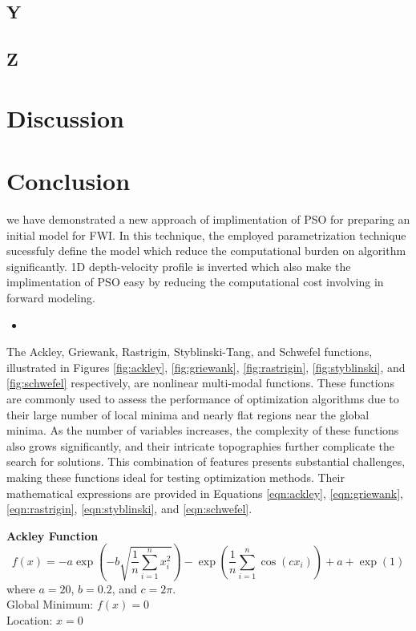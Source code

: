 \documentclass[paper,revised]{geophysics}
\begin{document}
\subsection{Y}
\subsection{Z}
\section{Discussion}
\section{Conclusion}
we have demonstrated a new approach of implimentation of PSO for preparing an initial model for FWI. In this technique, the employed parametrization technique sucessfuly define  the model which reduce the computational burden on algorithm significantly. 1D depth-velocity profile is inverted which also make the implimentation of PSO easy by reducing the computational cost involving in forward modeling.
\begin{itemize}
	\item 
\end{itemize}
\begin{acknowledgments}

\end{acknowledgments}

 \label{appendix_1}
The Ackley, Griewank, Rastrigin, Styblinski-Tang, and Schwefel functions, illustrated in Figures \ref{fig:ackley}, \ref{fig:griewank}, \ref{fig:rastrigin}, \ref{fig:styblinski}, and \ref{fig:schwefel} respectively, are nonlinear multi-modal functions. These functions are commonly used to assess the performance of optimization algorithms due to their large number of local minima and nearly flat regions near the global minima. As the number of variables increases, the complexity of these functions also grows significantly, and their intricate topographies further complicate the search for solutions. This combination of features presents substantial challenges, making these functions ideal for testing optimization methods.
Their mathematical expressions are provided in Equations \ref{eqn:ackley}, \ref{eqn:griewank}, \ref{eqn:rastrigin}, \ref{eqn:styblinski}, and \ref{eqn:schwefel}.

{\bf{Ackley Function}}
\begin{equation}
	f(x) = -a \exp\left(-b \sqrt{\frac{1}{n} \sum_{i=1}^{n} x_i^2}\right) - \exp\left(\frac{1}{n} \sum_{i=1}^{n} \cos(c x_i)\right) + a + \exp(1)
\end{equation}
where \( a = 20 \), \( b = 0.2 \), and \( c = 2\pi \).\\
Global Minimum: \(f(x)=0\)\\
Location: \(x=0\)
\end{document}
